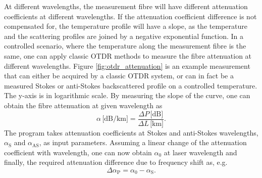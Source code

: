 \documentclass{standalone}
\begin{document}
At different wavelengths, the measurement fibre will have different attenuation coefficients at different wavelengths. If the attenuation coefficient difference is not compensated for, the temperature profile will have a slope, as the temperature and the scattering profiles are joined by a negative exponential function. In a controlled scenario, where the temperature along the measurement fibre is the same, one can apply classic OTDR methods to measure the fibre attenuation at different wavelengths. Figure \ref{fig:otdr_attenuation} is an example measurement that can either be acquired by a classic OTDR system, or can in fact be a measured Stokes or anti-Stokes backscattered profile on a controlled temperature. 
The y-axis is in logarithmic scale. By measuring the slope of the curve, one can obtain the fibre attenuation at given wavelength as
\begin{equation}
\alpha \, \textrm{[dB/km]} = \dfrac{\varDelta P \, \textrm{[dB]}}{\varDelta L \, \textrm{[km]}} \textrm{.}
\end{equation}
The program takes attenuation coefficients at Stokes and anti-Stokes wavelengths, $\alpha_\textrm{S}$ and $\alpha_\textrm{AS}$, as input parameters. Assuming a linear change of the attenuation coefficient with wavelength, one can now obtain $\alpha_0$ at laser wavelength and finally, the required attenuation difference due to frequency shift as, e.g.
\begin{equation}
\varDelta \alpha_\textrm{P} = \alpha_0 - \alpha_\textrm{S} \textrm{.}
\end{equation} \\
\end{document}
